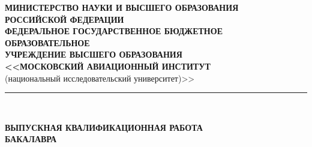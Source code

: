 \documentclass{article}
\begin{document}
\begin{center}
\begin{center}
\begin{minipage}{0.05\textwidth}%
    \resizebox{3cm}{!}{}
\end{minipage}
\hfill
\begin{minipage}{0.85\textwidth}\raggedleft
    \begin{center}
    \textbf{МИНИСТЕРСТВО НАУКИ И ВЫСШЕГО ОБРАЗОВАНИЯ\\ РОССИЙСКОЙ ФЕДЕРАЦИИ }\\
    \vspace{14pt}
    \textbf{ФЕДЕРАЛЬНОЕ ГОСУДАРСТВЕННОЕ БЮДЖЕТНОЕ ОБРАЗОВАТЕЛЬНОЕ\\
        УЧРЕЖДЕНИЕ ВЫСШЕГО ОБРАЗОВАНИЯ\\
    <<МОСКОВСКИЙ АВИАЦИОННЫЙ ИНСТИТУТ}\\ 
    (национальный исследовательский университет)>>
\end{center}
\end{minipage}
\end{center}
\vspace{14pt}
\rule{\textwidth}{2pt}\\

\vspace{14pt}

\begin{minipage}{\textwidth}

\end{minipage}

\vspace{14pt}
{\Large\textbf{ВЫПУСКНАЯ КВАЛИФИКАЦИОННАЯ РАБОТА}}\\
{\Large\textbf{БАКАЛАВРА}}\\
\vspace{14pt}


\end{center}
\end{document}
